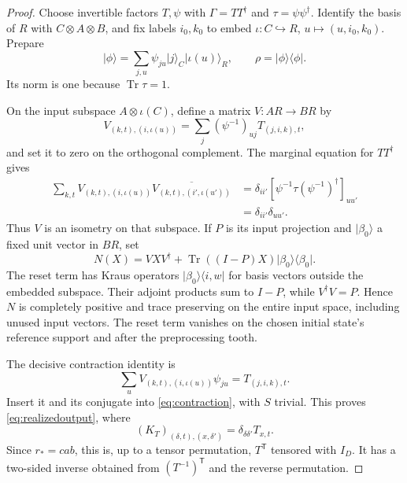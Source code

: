 \documentclass[11pt]{article}
\newcommand{\Tr}{\operatorname{Tr}}
\newcommand{\ket}[1]{\lvert #1\rangle}
\newcommand{\bra}[1]{\langle #1\rvert}
\theoremstyle{remark}
\begin{document}
\begin{proof}
Choose invertible factors $T,\psi$ with
$\Gamma=TT^\dagger$ and $\tau=\psi\psi^\dagger$. Identify the basis of $R$
with $C\otimes A\otimes B$, and fix labels $i_0,k_0$ to embed
$\iota:C\hookrightarrow R$, $u\mapsto(u,i_0,k_0)$. Prepare
\begin{equation}\label{eq:phi}
 \ket\phi=\sum_{j,u}\psi_{ju}\ket j_C\ket{\iota(u)}_R,
 \qquad\rho=\ket\phi\bra\phi.
\end{equation}
Its norm is one because $\Tr\tau=1$.

On the input subspace $A\otimes\iota(C)$, define a matrix $V:AR\to BR$ by
\begin{equation}\label{eq:v}
 V_{(k,t),(i,\iota(u))}=\sum_j(\psi^{-1})_{uj}T_{(j,i,k),t},
\end{equation}
and set it to zero on the orthogonal complement. The marginal equation
for $TT^\dagger$ gives
\begin{align*}
 \sum_{k,t}V_{(k,t),(i,\iota(u))}
             \overline{V_{(k,t),(i',\iota(u'))}}
 &=\delta_{ii'}[\psi^{-1}\tau(\psi^{-1})^\dagger]_{uu'}\\
 &=\delta_{ii'}\delta_{uu'}.
\end{align*}
Thus $V$ is an isometry on that subspace. If $P$ is its input projection and
$\ket{\beta_0}$ a fixed unit vector in $BR$, set
\begin{equation}\label{eq:insertion}
 N(X)=VXV^\dagger+\Tr((I-P)X)\ket{\beta_0}\bra{\beta_0}.
\end{equation}
The reset term has Kraus operators
$\ket{\beta_0}\bra{i,w}$ for basis vectors outside the embedded subspace.
Their adjoint products sum to $I-P$, while $V^\dagger V=P$. Hence $N$ is
completely positive and trace preserving on the entire input space,
including unused input vectors. The reset term vanishes on the chosen
initial state's reference support and after the preprocessing tooth.

The decisive contraction identity is
\[
 \sum_u V_{(k,t),(i,\iota(u))}\psi_{ju}=T_{(j,i,k),t}.
\]
Insert it and its conjugate into \eqref{eq:contraction}, with $S$ trivial.
This proves \eqref{eq:realizedoutput}, where
\begin{equation}\label{eq:kt}
 (K_T)_{(\delta,t),(x,\delta')}=\delta_{\delta\delta'}T_{x,t}.
\end{equation}
Since $r_*=cab$, this is, up to a tensor permutation, $T^{\mathsf T}$
tensored with $I_D$. It has a two-sided inverse obtained from
$(T^{-1})^{\mathsf T}$ and the reverse permutation.


\end{proof}
\end{document}
